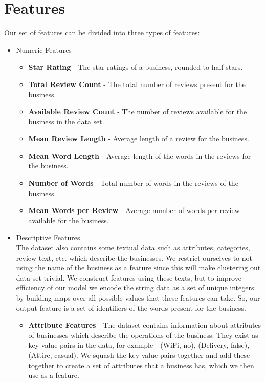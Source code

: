 \documentclass{article}
\begin{document}
\section{Features}
   Our set of features can be divided into three types of features:
   \begin{itemize}
      \item Numeric Features
         \begin{itemize}
            \item \textbf{Star Rating} - The star ratings of a business, rounded to half-stars.
            \item \textbf{Total Review Count} - The total number of reviews present for the business. 
               \item \textbf{Available Review Count} - The number of reviews available for the business in the data set.
               \item \textbf{Mean Review Length} - Average length of a review for the business.
               \item \textbf{Mean Word Length} - Average length of the words in the reviews for the business.
               \item \textbf{Number of Words} - Total number of words in the reviews of the business.
               \item \textbf{Mean Words per Review} - Average number of words per review available for the business.
         \end{itemize}

      \item Descriptive Features \\
         The dataset also contains some textual data such as attributes, categories, review text, etc. which describe the businesses.
         We restrict ourselves to not using the name of the business as a feature since this will make clustering out data set trivial.
         We construct features using these texts, but to improve efficiency of our model we encode the string data as a set of unique integers by building maps over all possible values that these features can take.
         So, our output feature is a set of identifiers of the words present for the business.
         \begin{itemize}
            \item
               \textbf{Attribute Features} - The dataset contains information about attributes of businesses which describe the operations of the business.
               They exist as key-value pairs in the data, for example - (WiFi, no), (Delivery, false), (Attire, casual).
               We squash the key-value pairs together and add these together to create a set of attributes that a business has, which we then use as a feature.


\end{itemize}
\end{itemize}
\end{document}
